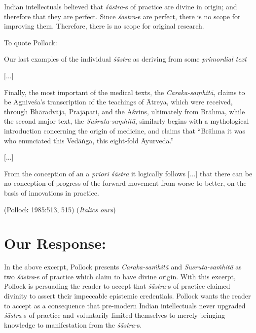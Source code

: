 Indian intellectuals believed that {{\sl śāstra}\relax}-s of practice are divine in origin; and therefore that they are perfect. Since {{\sl śāstra}\relax}-s are perfect, there is no scope for improving them. Therefore, there is no scope for original research.

To quote Pollock:
\begin{myquote}
Our last examples of the individual {\sl śāstra} as deriving from some {\sl primordial text}

[...]

Finally, the most important of the medical texts, the {\sl Caraka-saṃhitā}, claims to be Agniveśa's transcription of the teachings of Ātreya, which were received, through Bhāradvāja, Prajāpati, and the Aśvins, ultimately from Brāhma, while the second major text, the {\sl Suśruta-saṃhitā}, similarly begins with a mythological introduction concerning the origin of medicine, and claims that ``Brāhma it was who enunciated this Vedāṅga, this eight-fold Āyurveda.''

[...]

\newpage

From the conception of an a {\sl priori śāstra} it logically follows [...] that there can be no conception of progress of the forward movement from worse to better, on the basis of innovations in practice. 

\hfill (Pollock 1985:513, 515) ({\sl Italics ours})
\end{myquote}

\section*{Our Response:}

In the above excerpt, Pollock presents {\sl Caraka-saṁhitā} and {\sl Susruta-saṁhitā} as two {\sl śāstra}-s of practice which claim to have divine origin.  With this excerpt, Pollock is persuading the reader to accept that {\sl śāstra}-s of practice claimed divinity to assert their impeccable epistemic credentials. Pollock wants the reader to accept as a consequence that pre-modern Indian intellectuals never upgraded {\sl śāstra}-s of practice and voluntarily limited themselves to merely bringing knowledge to manifestation from the {\sl śāstra}-s.

